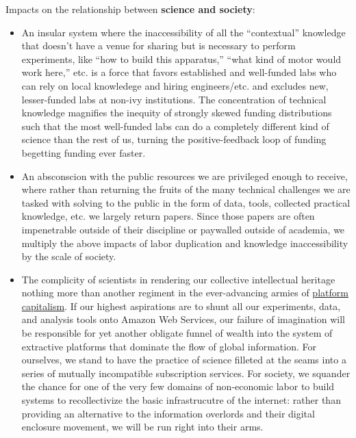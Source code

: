 \documentclass[10pt]{article}
\begin{document}
\begin{multicols}{2}
Impacts on the relationship between \textbf{science and society}:

\begin{itemize}

\item
  An insular system where the inaccessibility of all the ``contextual''
  knowledge \cite{woolKnowledgeNetworksHow2020, barleyBackroomsScienceWork1994}  that doesn't have a venue for
  sharing but is necessary to perform experiments, like ``how to build
  this apparatus,'' ``what kind of motor would work here,'' etc. is a
  force that favors established and well-funded labs who can rely on
  local knowledege and hiring engineers/etc. and excludes new,
  lesser-funded labs at non-ivy institutions. The concentration of
  technical knowledge magnifies the inequity of strongly skewed funding
  distributions such that the most well-funded labs can do a completely
  different kind of science than the rest of us, turning the
  positive-feedback loop of funding begetting funding ever faster.
\item
  An absconscion with the public resources we are privileged enough to
  receive, where rather than returning the fruits of the many technical
  challenges we are tasked with solving to the public in the form of
  data, tools, collected practical knowledge, etc. we largely return
  papers. Since those papers are often impenetrable outside of their
  discipline or paywalled outside of academia, we multiply the above
  impacts of labor duplication and knowledge inaccessibility by the
  scale of society.
\item
  The complicity of scientists in rendering our collective intellectual
  heritage nothing more than another regiment in the ever-advancing
  armies of
  \protect\hyperlink{platforms-industry-capture-and-the-profit-motive}{platform
  capitalism}. If our highest aspirations are to shunt all our
  experiments, data, and analysis tools onto Amazon Web Services, our
  failure of imagination will be responsible for yet another obligate
  funnel of wealth into the system of extractive platforms that dominate
  the flow of global information. For ourselves, we stand to have the
  practice of science filleted at the seams into a series of mutually
  incompatible subscription services. For society, we squander the
  chance for one of the very few domains of non-economic labor to build
  systems to recollectivize the basic infrastrucutre of the internet:
  rather than providing an alternative to the information overlords and
  their digital enclosure movement, we will be run right into their
  arms.
\end{itemize}


\end{multicols}
\end{document}
